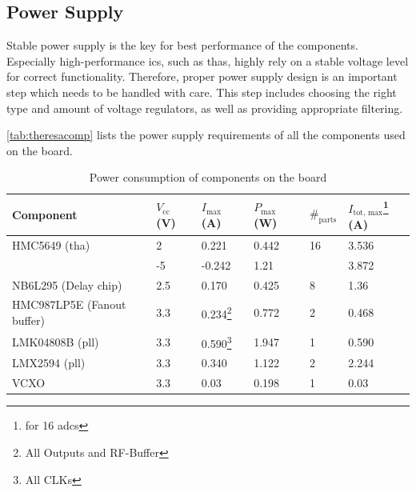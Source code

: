 \subsection{Power Supply}
Stable power supply is the key for best performance of the components. Especially high-performance \Glspl{ic}, such as \glspl{tha}, highly rely on a stable voltage level for correct functionality. 
Therefore, proper power supply design is an important step which needs to be handled with care.
This step includes choosing the right type and amount of voltage regulators, as well as providing appropriate filtering. 

\autoref{tab:theresacomp} lists the power supply requirements of all the components used on the board.

\begin{table}[tbh]
	\caption{Power consumption of components on the board}
	\label{tab:theresacomp}
	\begin{minipage}{\textwidth}
		\centering
		\begin{tabularx}{\textwidth}{Xlllll}
			\toprule
			\textbf{Component}         & $V_\text{cc}$ (V) & $I_\text{max}$ (A)                        & $P_\text{max}$ (W) & $\#_\text{parts}$ & $I_\text{tot, max}$\footnote{for 16 \glspl{adc}} (A) \\ \midrule
			HMC5649 (\gls{tha})        & 2                 & 0.221                                     & 0.442              & 16                & 3.536                                                \\
			                           & -5                & -0.242                                    & 1.21               &                   & 3.872                                                \\
			NB6L295 (Delay chip)       & 2.5               & 0.170                                     & 0.425              & 8                 & 1.36                                                 \\
			HMC987LP5E (Fanout buffer) & 3.3               & 0.234\footnote{All Outputs and RF-Buffer} & 0.772              & 2                 & 0.468                                                \\
			LMK04808B (\gls{pll})      & 3.3               & 0.590\footnote{All CLKs}                  & 1.947              & 1                 & 0.590                                                \\
			LMX2594 (\gls{pll})        & 3.3               & 0.340                                     & 1.122              & 2                 & 2.244                                                \\
			VCXO                       & 3.3               & 0.03                                      & 0.198              & 1                 & 0.03                                                 \\ \bottomrule
		\end{tabularx}
	\end{minipage}
\end{table}

